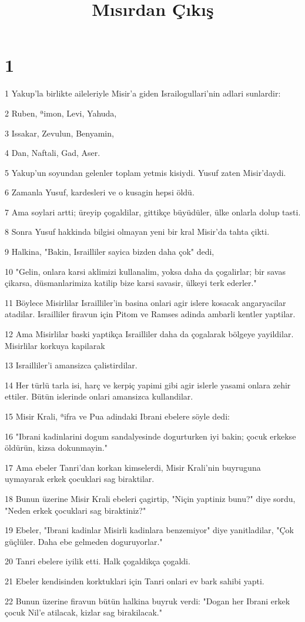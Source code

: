 

\title{Mısırdan Çıkış}


\chapter{1}

\par 1 Yakup'la birlikte aileleriyle Misir'a giden Israilogullari'nin adlari sunlardir:
\par 2 Ruben, ªimon, Levi, Yahuda,
\par 3 Issakar, Zevulun, Benyamin,
\par 4 Dan, Naftali, Gad, Aser.
\par 5 Yakup'un soyundan gelenler toplam yetmis kisiydi. Yusuf zaten Misir'daydi.
\par 6 Zamanla Yusuf, kardesleri ve o kusagin hepsi öldü.
\par 7 Ama soylari artti; üreyip çogaldilar, gittikçe büyüdüler, ülke onlarla dolup tasti.
\par 8 Sonra Yusuf hakkinda bilgisi olmayan yeni bir kral Misir'da tahta çikti.
\par 9 Halkina, "Bakin, Israilliler sayica bizden daha çok" dedi,
\par 10 "Gelin, onlara karsi aklimizi kullanalim, yoksa daha da çogalirlar; bir savas çikarsa, düsmanlarimiza katilip bize karsi savasir, ülkeyi terk ederler."
\par 11 Böylece Misirlilar Israilliler'in basina onlari agir islere kosacak angaryacilar atadilar. Israilliler firavun için Pitom ve Ramses adinda ambarli kentler yaptilar.
\par 12 Ama Misirlilar baski yaptikça Israilliler daha da çogalarak bölgeye yayildilar. Misirlilar korkuya kapilarak
\par 13 Israilliler'i amansizca çalistirdilar.
\par 14 Her türlü tarla isi, harç ve kerpiç yapimi gibi agir islerle yasami onlara zehir ettiler. Bütün islerinde onlari amansizca kullandilar.
\par 15 Misir Krali, ªifra ve Pua adindaki Ibrani ebelere söyle dedi:
\par 16 "Ibrani kadinlarini dogum sandalyesinde dogurturken iyi bakin; çocuk erkekse öldürün, kizsa dokunmayin."
\par 17 Ama ebeler Tanri'dan korkan kimselerdi, Misir Krali'nin buyruguna uymayarak erkek çocuklari sag biraktilar.
\par 18 Bunun üzerine Misir Krali ebeleri çagirtip, "Niçin yaptiniz bunu?" diye sordu, "Neden erkek çocuklari sag biraktiniz?"
\par 19 Ebeler, "Ibrani kadinlar Misirli kadinlara benzemiyor" diye yanitladilar, "Çok güçlüler. Daha ebe gelmeden doguruyorlar."
\par 20 Tanri ebelere iyilik etti. Halk çogaldikça çogaldi.
\par 21 Ebeler kendisinden korktuklari için Tanri onlari ev bark sahibi yapti.
\par 22 Bunun üzerine firavun bütün halkina buyruk verdi: "Dogan her Ibrani erkek çocuk Nil'e atilacak, kizlar sag birakilacak."


